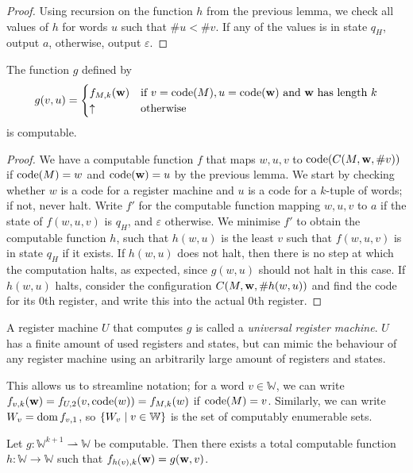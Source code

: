 \begin{proof}
	Using recursion on the function \( h \) from the previous lemma, we check all values of \( h \) for words \( u \) such that \( \# u < \# v \).
	If any of the values is in state \( q_H \), output \( a \), otherwise, output \( \varepsilon \).
\end{proof}
\begin{theorem}
	The function \( g \) defined by
	\[ g(v,u) = \begin{cases}
		f_{M,k}(\vb w) & \text{if } v = \operatorname{code}(M), u = \operatorname{code}(\vb w) \text{ and \( \vb w \) has length \( k \)} \\
		\uparrow & \text{otherwise}
	\end{cases} \]
	is computable.
\end{theorem}
\begin{proof}
	We have a computable function \( f \) that maps \( w, u, v \) to \( \operatorname{code}(C(M,\vb w, \# v)) \) if \( \operatorname{code}(M) = w \) and \( \operatorname{code}(\vb w) = u \) by the previous lemma.
	We start by checking whether \( w \) is a code for a register machine and \( u \) is a code for a \( k \)-tuple of words; if not, never halt.
	Write \( f' \) for the computable function mapping \( w, u, v \) to \( a \) if the state of \( f(w,u,v) \) is \( q_H \), and \( \varepsilon \) otherwise.
	We minimise \( f' \) to obtain the computable function \( h \), such that \( h(w,u) \) is the least \( v \) such that \( f(w,u,v) \) is in state \( q_H \) if it exists.
	If \( h(w,u) \) does not halt, then there is no step at which the computation halts, as expected, since \( g(w,u) \) should not halt in this case.
	If \( h(w,u) \) halts, consider the configuration \( C(M,\vb w, \#h(w,u)) \) and find the code for its 0th register, and write this into the actual 0th register.
\end{proof}
\begin{remark}
	A register machine \( U \) that computes \( g \) is called a \emph{universal register machine}.
	\( U \) has a finite amount of used registers and states, but can mimic the behaviour of any register machine using an arbitrarily large amount of registers and states.

	This allows us to streamline notation; for a word \( v \in \mathbb W \), we can write \( f_{v,k}(\vb w) = f_{U,2}(v,\operatorname{code}(w)) = f_{M,k}(w) \) if \( \operatorname{code}(M) = v \).
	Similarly, we can write \( W_v = \operatorname{dom} f_{v,1} \), so \( \qty{W_v \mid v \in \mathbb W} \) is the set of computably enumerable sets.
\end{remark}
\begin{theorem}
	Let \( g \colon \mathbb W^{k+1} \rightharpoonup \mathbb W \) be computable.
	Then there exists a total computable function \( h \colon \mathbb W \to \mathbb W \) such that \( f_{h(v),k}(\vb w) = g(\vb w, v) \).
\end{theorem}
